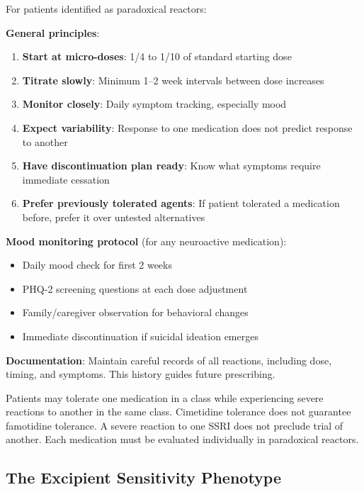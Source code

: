 \begin{directive}
\label{dir:paradoxical-protocol}
For patients identified as paradoxical reactors:

\textbf{General principles}:
\begin{enumerate}
    \item \textbf{Start at micro-doses}: 1/4 to 1/10 of standard starting dose
    \item \textbf{Titrate slowly}: Minimum 1--2 week intervals between dose increases
    \item \textbf{Monitor closely}: Daily symptom tracking, especially mood
    \item \textbf{Expect variability}: Response to one medication does not predict response to another
    \item \textbf{Have discontinuation plan ready}: Know what symptoms require immediate cessation
    \item \textbf{Prefer previously tolerated agents}: If patient tolerated a medication before, prefer it over untested alternatives
\end{enumerate}

\textbf{Mood monitoring protocol} (for any neuroactive medication):
\begin{itemize}
    \item Daily mood check for first 2 weeks
    \item PHQ-2 screening questions at each dose adjustment
    \item Family/caregiver observation for behavioral changes
    \item Immediate discontinuation if suicidal ideation emerges
\end{itemize}

\textbf{Documentation}: Maintain careful records of all reactions, including dose, timing, and symptoms. This history guides future prescribing.
\end{directive}

\begin{observation}
Patients may tolerate one medication in a class while experiencing severe reactions to another in the same class. Cimetidine tolerance does not guarantee famotidine tolerance. A severe reaction to one SSRI does not preclude trial of another. Each medication must be evaluated individually in paradoxical reactors.
\end{observation}

\subsection{The Excipient Sensitivity Phenotype}
\label{sec:excipient-sensitivity}

